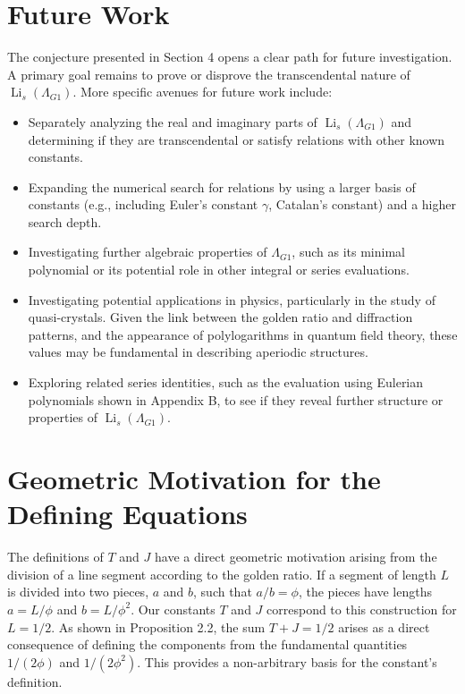 \documentclass{amsart}
\theoremstyle{plain}
\theoremstyle{definition}
\theoremstyle{remark}
\DeclareMathOperator{\Li}{Li} %
\newcommand{\LambdaG}{\Lambda_{G1}}
\newcommand{\phiG}{\phi}
\begin{document}
\section{Future Work}
The conjecture presented in Section 4 opens a clear path for future investigation. A primary goal remains to prove or disprove the transcendental nature of $\Li_s(\LambdaG)$. More specific avenues for future work include:
\begin{itemize}
    \item Separately analyzing the real and imaginary parts of $\Li_s(\LambdaG)$ and determining if they are transcendental or satisfy relations with other known constants.
    \item Expanding the numerical search for relations by using a larger basis of constants (e.g., including Euler's constant $\gamma$, Catalan's constant) and a higher search depth.
    \item Investigating further algebraic properties of $\LambdaG$, such as its minimal polynomial or its potential role in other integral or series evaluations.
    \item Investigating potential applications in physics, particularly in the study of quasi-crystals. Given the link between the golden ratio and diffraction patterns, and the appearance of polylogarithms in quantum field theory, these values may be fundamental in describing aperiodic structures.
    \item Exploring related series identities, such as the evaluation using Eulerian polynomials shown in Appendix B, to see if they reveal further structure or properties of $\Li_s(\LambdaG)$.
\end{itemize}

\appendix
\section{Geometric Motivation for the Defining Equations}
The definitions of $T$ and $J$ have a direct geometric motivation arising from the division of a line segment according to the golden ratio. If a segment of length $L$ is divided into two pieces, $a$ and $b$, such that $a/b = \phiG$, the pieces have lengths $a=L/\phiG$ and $b=L/\phiG^2$. Our constants $T$ and $J$ correspond to this construction for $L=1/2$. As shown in Proposition 2.2, the sum $T+J=1/2$ arises as a direct consequence of defining the components from the fundamental quantities $1/(2\phiG)$ and $1/(2\phiG^2)$. This provides a non-arbitrary basis for the constant's definition.
\end{document}
